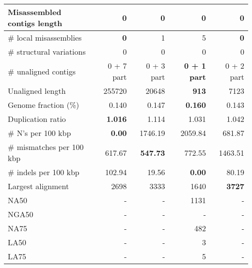 \documentclass[12pt,a4paper]{article}
\begin{document}
\begin{table}[ht]
\begin{center}
\begin{tabular}{|l*{4}{|r}|}
Misassembled contigs length & 0 & 0 & 0 & 0 \\ \hline
\# local misassemblies & {\bf 0} & 1 & 5 & {\bf 0} \\ \hline
\# structural variations & 0 & 0 & 0 & 0 \\ \hline
\# unaligned contigs & 0 + 7 part & 0 + 3 part & {\bf 0 + 1 part} & 0 + 2 part \\ \hline
Unaligned length & 255720 & 20648 & {\bf 913} & 7123 \\ \hline
Genome fraction (\%) & 0.140 & 0.147 & {\bf 0.160} & 0.143 \\ \hline
Duplication ratio & {\bf 1.016} & 1.114 & 1.031 & 1.042 \\ \hline
\# N's per 100 kbp & {\bf 0.00} & 1746.19 & 2059.84 & 681.87 \\ \hline
\# mismatches per 100 kbp & 617.67 & {\bf 547.73} & 772.55 & 1463.51 \\ \hline
\# indels per 100 kbp & 102.94 & 19.56 & {\bf 0.00} & 80.19 \\ \hline
Largest alignment & 2698 & 3333 & 1640 & {\bf 3727} \\ \hline
NA50 & - & - & 1131 & - \\ \hline
NGA50 & - & - & - & - \\ \hline
NA75 & - & - & 482 & - \\ \hline
LA50 & - & - & 3 & - \\ \hline
LA75 & - & - & 5 & - \\ \hline
\end{tabular}
\end{center}
\end{table}
\end{document}
